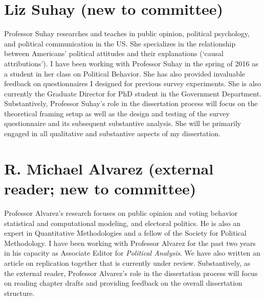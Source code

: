 \documentclass[11pt]{article}
\begin{document}
\section*{Liz Suhay (new to committee)}

\vspace{0.3cm}

Professor Suhay researches and teaches in public opinion, political psychology, and political communication in the US. She specializes in the relationship between Americans' political attitudes and their explanations (`causal attributions'). I have been working with Professor Suhay in the spring of 2016 as a student in her class on Political Behavior. She has also provided invaluable feedback on questionnaires I designed for previous survey experiments. She is also currently the Graduate Director for PhD student in the Government Department. Substantively, Professor Suhay's role in the dissertation process will focus on the theoretical framing setup as well as the design and testing of the survey questionnaire and its subsequent substantive analysis. She will be primarily engaged in all qualitative and substantive aspects of my dissertation.

\section*{R. Michael Alvarez (external reader; new to committee)}

\vspace{0.3cm}

Professor Alvarez's research focuses on public opinion and voting behavior statistical and computational modeling, and electoral politics. He is also an expert in Quantitative Methodologies and a fellow of the Society for Political Methodology. I have been working with Professor Alvarez for the past two years in his capacity as Associate Editor for \textit{Political Analysis}. We have also written an article on replication together that is currently under review. Substantively, as the external reader, Professor Alvarez's role in the dissertation process will focus on reading chapter drafts and providing feedback on the overall dissertation structure. \\
\end{document}
